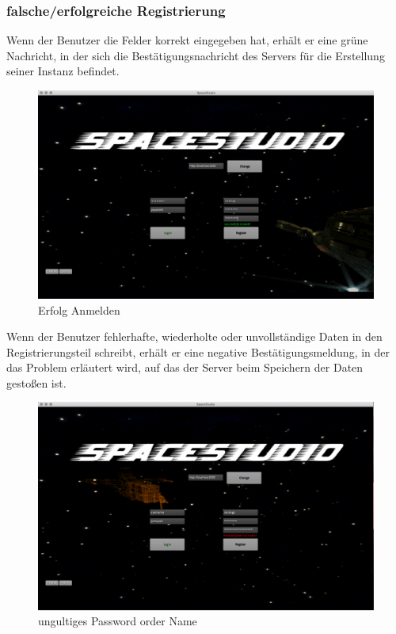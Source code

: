 \documentclass[12pt]{article}
\begin{document}
\subsubsection{falsche/erfolgreiche  Registrierung}
Wenn der Benutzer die Felder korrekt eingegeben hat, erhält er eine grüne Nachricht, in der sich die Bestätigungsnachricht des Servers für die Erstellung seiner Instanz befindet.\\
\begin{figure}[h]
\centering
\includegraphics[scale=0.3]{TestProtocolBilder/erfolgAnmelden.png}
\caption{Erfolg Anmelden}
\end{figure}

Wenn der Benutzer fehlerhafte, wiederholte oder unvollständige Daten in den Registrierungsteil schreibt, erhält er eine negative Bestätigungsmeldung, in der das Problem erläutert wird, auf das der Server beim Speichern der Daten gestoßen ist.\\
\begin{figure}[h]
\centering
\includegraphics[scale=0.3]{TestProtocolBilder/doesnotMatchPassword.png}
\caption{ungultiges Password order Name}
\end{figure}
\newpage
\end{document}

